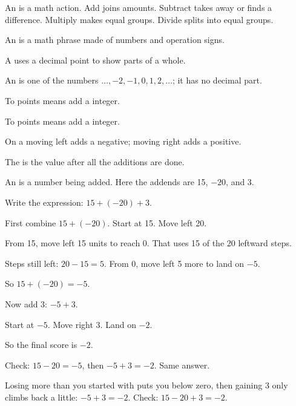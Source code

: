 \begin{words}
  \item An is a math action. Add joins amounts. Subtract takes away or finds a difference. Multiply makes equal groups. Divide splits into equal groups.
  \item An is a math phrase made of numbers and operation signs.
  \item A uses a decimal point to show parts of a whole.
  \item An is one of the numbers $\ldots, -2, -1, 0, 1, 2, \ldots$; it has no decimal part.
  \item To points means add a integer.
  \item To points means add a integer.
  \item On a moving left adds a negative; moving right adds a positive.
  \item The is the value after all the additions are done.
  \item An is a number being added. Here the addends are 15, $-20$, and 3.
\end{words}

\begin{steps}
  \item Write the expression: $15 + (-20) + 3$.
  \item First combine $15 + (-20)$. Start at 15. Move left 20.
  \item From 15, move left 15 units to reach 0. That uses 15 of the 20 leftward steps.
  \item Steps still left: $20 - 15 = 5$. From 0, move left 5 more to land on $-5$.
  \item So $15 + (-20) = -5$.
  \item Now add 3: $-5 + 3$.
  \item Start at $-5$. Move right 3. Land on $-2$.
  \item So the final score is $-2$.
  \item Check: $15 - 20 = -5$, then $-5 + 3 = -2$. Same answer.
\end{steps}


Losing more than you started with puts you below zero, then gaining 3 only climbs back a little: $-5 + 3 = -2$. Check: $15 - 20 + 3 = -2$.

